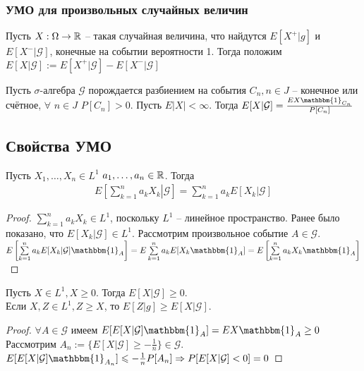         \subsubsection{УМО для произвольных случайных величин}

        \begin{definition}\label{extralect:def2}
            Пусть $X:\Omega\to\mathbb{R}$ -- такая случайная величина, что найдутся $E[X^+|g]$ и $E[X^-|\mathcal{G}]$, конечные на событии вероятности 1. 
            Тогда положим $E[X|\mathcal{G}]:=E[X^+|\mathcal{G}]-E[X^-|\mathcal{G}]$
        \end{definition}

        
        \begin{theorem}\label{extralect:the1}
            Пусть $\sigma$-алгебра $\mathcal{G}$ порождается разбиением  на события $C_n, n\in J$ -- конечное или счётное, $\forall$ $n\in J$ $P[C_n]>0$. Пусть ${E|X|<\infty}$. 
            Тогда $E[X|\mathcal{G}]=\frac{EX\mathbbm{1}_{C_n}}{P[C_n]}$
        \end{theorem}

        \subsection{Свойства УМО}
        \begin{lemma}
            Пусть $X_1, \ldots, X_n \in L^1$ $a_1, \ldots, a_n \in \mathbb{R}$. Тогда 
            \begin{eqnarray}
            E\left[\left.\sum\limits_{k=1}^{n} a_k X_k \right|\mathcal{G}\right] = \sum\limits_{k=1}^{n} a_k E[X_k|\mathcal{G}]
            \end{eqnarray}
        \end{lemma}
        \begin{proof}
            $\sum\limits_{k=1}^{n} a_k X_k \in L^1$, поскольку $L^1$ -- линейное пространство. Ранее было показано, что $E[X_k|\mathcal{G}] \in L^1$. Рассмотрим произвольное событие $A \in \mathcal{G}$. \\
            $E\left[\sum\limits_{k=1}^{n} a_k E[X_k|\mathcal{G}] \mathbbm{1}_{A}\right] = E\sum\limits_{k=1}^{n} a_k E[X_k\mathbbm{1}_{A}] = E\left[\sum\limits_{k=1}^{n} a_k X_k\mathbbm{1}_{A}\right]$
        \end{proof}

        \begin{lemma}
            Пусть $X\in L^1, X\ge0$. Тогда $E[X|\mathcal{G}]\ge0$.\\
            Если $X, Z \in L^1, Z \ge X$, то $E[Z|g] \ge E[X|\mathcal{G}]$.
        \end{lemma}
        \begin{proof}
            $\forall A \in \mathcal{G}$ имеем $E[E[X|\mathcal{G}]\mathbbm{1}_{A}] = EX\mathbbm{1}_{A}\ge0$ \\
            Рассмотрим $A_n:=\{E[X|\mathcal{G}]\ge -\frac{1}{n}\} \in \mathcal{G}$. $E[E[X|\mathcal{G}]\mathbbm{1}_{A_n}] \leqslant -\frac{1}{n} P[A_n] \Rightarrow P[E[X|\mathcal{G}]<0] = 0$
        \end{proof}

